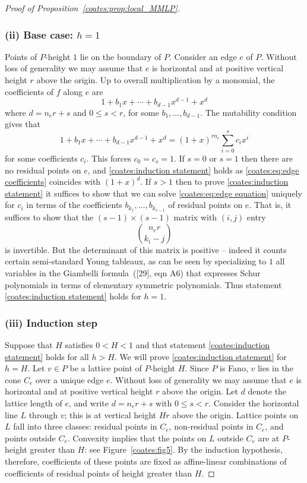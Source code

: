 \begin{proof}[Proof of Proposition~\ref{coates:prop:local_MMLP}]
  \subsubsection*{(ii) Base case: $h=1$} Points of $P$-height $1$ lie on the boundary of $P$. Consider an edge $e$ of $P$. Without loss of generality we may assume that $e$ is horizontal and at positive vertical height $r$ above the origin. Up to overall multiplication by a monomial, the coefficients of $f$ along $e$ are
  \begin{equation}
    \label{coates:eq:edge coefficients}
    1 + b_1 x + \cdots + b_{d-1} x^{d-1} + x^d  
  \end{equation}
  where $d = n_e r+s$ and $0 \leq s < r$, for some $b_1,\ldots,b_{d-1}$. The mutability condition gives that 
  \begin{equation}
    \label{coates:eq:edge equation}
    1 + b_1 x + \cdots + b_{d-1} x^{d-1} + x^d = 
    (1+x)^{r n_e} \sum_{i=0}^s c_i x^i
  \end{equation}
  for some coefficients $c_i$. This forces $c_0 = c_s = 1$. If $s = 0$ or $s = 1$ then there are no residual points on $e$, and \eqref{coates:induction statement} holds as \eqref{coates:eq:edge coefficients} coincides with $(1+x)^d$. If $s>1$ then to prove \eqref{coates:induction statement} it suffices to show that we can solve \eqref{coates:eq:edge equation} uniquely for $c_i$ in terms of the coefficients $b_{k_1}, \ldots, b_{k_{s-1}}$ of residual points on $e$. That is, it suffices to show that the $(s-1) \times (s-1)$ matrix with $(i,j)$ entry
  \[
      { n_e r \choose k_i - j}
  \]
  is invertible. But the determinant of this matrix is positive -- indeed it counts certain semi-standard Young tableaux, as can be seen by specializing to $1$ all variables in the Giambelli formula~\textup{([29], eqn A6)} that expresses Schur polynomials in terms of elementary symmetric polynomials. Thus statement \eqref{coates:induction statement} holds for $h=1$. 

  \subsubsection*{(iii) Induction step} Suppose that $H$ satisfies $0 < H < 1$ and that statement \eqref{coates:induction statement} holds for all $h > H$. We will prove \eqref{coates:induction statement} for $h=H$. Let $v \in P$ be a lattice point of $P$-height $H$. Since $P$ is Fano, $v$ lies in the cone $C_e$ over a unique edge $e$. Without loss of generality we may assume that $e$ is horizontal and at positive vertical height $r$ above the origin. Let $d$ denote the lattice length of $e$, and write $d = n_e r + s$ with $0 \leq s < r$. Consider the horizontal line $L$ through $v$; this is at vertical height $Hr$ above the origin. Lattice points on $L$ fall into three classes: residual points in $C_e$, non-residual points in $C_e$, and points outside $C_e$. Convexity implies that the points on $L$ outside $C_e$ are at $P$-height greater than $H$: see Figure~\ref{coates:fig5}. By the induction hypothesis, therefore, coefficients of these points are fixed as affine-linear combinations of coefficients of residual points of height greater than $H$. 
  

\end{proof}
